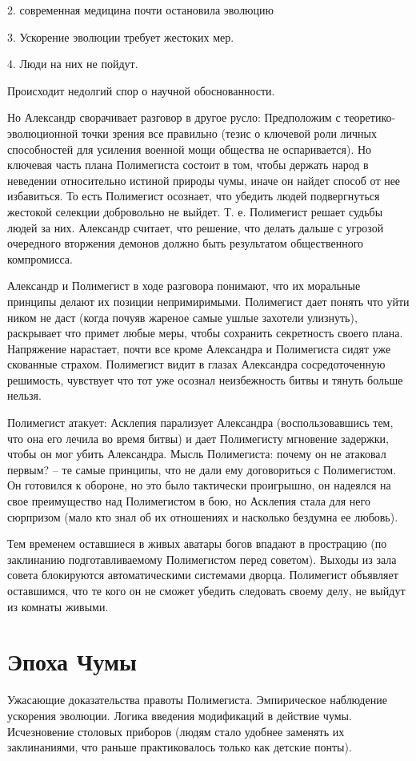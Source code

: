 \documentclass[12pt,a4paper]{article}
\begin{document}
2. современная медицина почти остановила эволюцию

3. Ускорение эволюции требует жестоких мер.

4. Люди на них не пойдут.

Происходит недолгий спор о научной обоснованности.

Но Александр сворачивает разговор в другое русло: Предположим с теоретико-эволюционной точки зрения все правильно (тезис о ключевой роли личных способностей для усиления военной мощи общества не оспаривается). Но ключевая часть плана Полимегиста состоит в том, чтобы держать народ в неведении относительно истиной природы чумы, иначе он найдет способ от нее избавиться. То есть Полимегист осознает, что убедить людей подвергнуться жестокой селекции добровольно не выйдет. Т. е. Полимегист решает судьбы людей за них. Александр считает, что решение, что делать дальше с угрозой очередного вторжения демонов должно быть результатом общественного компромисса.

Александр и Полимегист в ходе разговора понимают, что их моральные принципы делают их позиции непримиримыми. Полимегист дает понять что уйти ником не даст (когда почуяв жареное самые ушлые захотели улизнуть), раскрывает что примет любые меры, чтобы сохранить секретность своего плана. Напряжение нарастает, почти все кроме Александра и Полимегиста сидят уже скованные страхом. Полимегист видит в глазах Александра сосредоточенную решимость, чувствует что тот уже осознал неизбежность битвы и тянуть больше нельзя.

Полимегист атакует: Асклепия парализует Александра (воспользовавшись тем, что она его лечила во время битвы) и дает Полимегисту мгновение задержки, чтобы он мог убить Александра. Мысль Полимегиста: почему он не атаковал первым? -- те самые принципы, что не дали ему договориться с Полимегистом. Он готовился к обороне, но это было тактически проигрышно, он надеялся на свое преимущество над Полимегистом в бою, но Асклепия стала для него сюрпризом (мало кто знал об их отношениях и насколько бездумна ее любовь).

Тем временем оставшиеся в живых аватары богов впадают в прострацию (по заклинанию подготавливаемому Полимегистом перед советом). Выходы из зала совета блокируются автоматическими системами дворца. Полимегист объявляет оставшимся, что те кого он не сможет убедить следовать своему делу, не выйдут из комнаты живыми.


\section*{Эпоха Чумы}
Ужасающие доказательства правоты Полимегиста.
Эмпирическое наблюдение ускорения эволюции.
Логика введения модификаций в действие чумы.
Исчезновение столовых приборов (людям стало удобнее заменять их заклинаниями, что раньше практиковалось только как детские понты).
\end{document}
